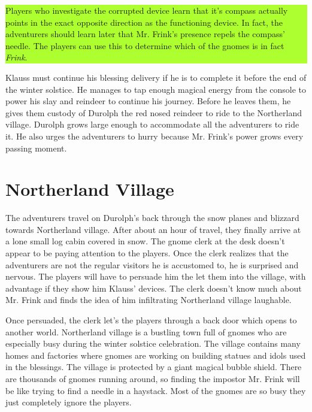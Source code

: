 \documentclass{article}
\begin{document}
\begin{multicols*}{2}
	\colorbox{GreenYellow}{\begin{minipage}{0.4\textwidth}
		Players who investigate the corrupted device learn that it's compass actually points in the exact opposite direction as the functioning device. In fact, the adventurers should learn later that Mr. Frink's presence repels the compass' needle. The players can use this to determine which of the gnomes is in fact \emph{Frink}. 			
	\end{minipage}}
	\break
	
	Klauss must continue his blessing delivery if he is to complete it before the end of the winter solstice. He manages to tap enough magical energy from the console to power his slay and reindeer to continue his journey. Before he leaves them, he gives them custody of Durolph the red nosed reindeer to ride to the Northerland village. Durolph grows large enough to accommodate all the adventurers to ride it. He also urges the adventurers to hurry because Mr. Frink's power grows every passing moment. 
	
	\section{Northerland Village}

	The adventurers travel on Durolph's back through the snow planes and blizzard towards Northerland village. After about an hour of travel, they finally arrive at a lone small log cabin covered in snow. The gnome clerk at the desk doesn't appear to be paying attention to the players. Once the clerk realizes that the adventurers are not the regular visitors he is accustomed to, he is surprised and nervous. The players will have to persuade him the let them into the village, with advantage if they show him Klauss' devices. The clerk doesn't know much about Mr. Frink and finds the idea of him infiltrating Northerland village laughable.
	
	Once persuaded, the clerk let's the players through a back door which opens to another world. Northerland village is a bustling town full of gnomes who are especially busy during the winter solstice celebration. The village contains many homes and factories where gnomes are working on building statues and idols used in the blessings. The village is protected by a giant magical bubble shield. There are thousands of gnomes running around, so finding the impostor Mr. Frink will be like trying to find a needle in a haystack. Most of the gnomes are so busy they just completely ignore the players.
	

\end{multicols*}
\end{document}
